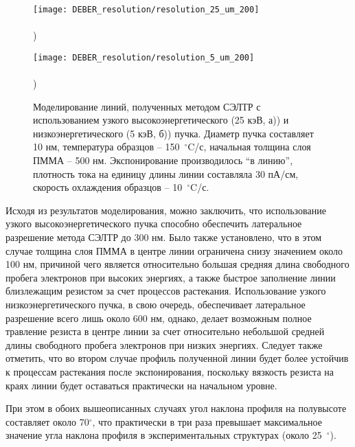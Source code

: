 \begin{figure}[t]
	\begin{minipage}{0.48\textwidth}
		\texttt{[image: DEBER\_resolution/resolution\_25\_um\_200]} \\
		\vspace{-28.7ex} \\ ) \\ \vspace{28.7ex}
	\end{minipage}
	\begin{minipage}{0.48\textwidth}
		\texttt{[image: DEBER\_resolution/resolution\_5\_um\_200]} \\
		\vspace{-28.7ex} \\ ) \\ \vspace{28.7ex}
	\end{minipage}
	\vspace{-3.5em}
	\caption{Моделирование линий, полученных методом СЭЛТР с использованием узкого высокоэнергетического (25 кэВ, а)) и низкоэнергетического (5 кэВ, б)) пучка. Диаметр пучка составляет 10 нм, температура образцов -- 150~$^\circ$C/с, начальная толщина слоя ПММА -- 500 нм. Экспонирование производилось ``в линию'', плотность тока на единицу длины линии составляла 30 пА/см, скорость охлаждения образцов -- 10~$^\circ$C/с.}
	\label{fig:DEBER_resolution}
\end{figure}

Исходя из результатов моделирования, можно заключить, что использование узкого высокоэнергетического пучка способно обеспечить латеральное разрешение метода СЭЛТР до 300 нм. Было также установлено, что в этом случае толщина слоя ПММА в центре линии ограничена снизу значением около 100 нм, причиной чего является относительно большая средняя длина свободного пробега электронов при высоких энергиях, а также быстрое заполнение линии близлежащим резистом за счет процессов растекания. Использование узкого низкоэнергетического пучка, в свою очередь, обеспечивает латеральное разрешение всего лишь около 600 нм, однако, делает возможным полное травление резиста в центре линии за счет относительно небольшой средней длины свободного пробега электронов при низких энергиях. Следует также отметить, что во втором случае профиль полученной линии будет более устойчив к процессам растекания после экспонирования, поскольку вязкость резиста на краях линии будет оставаться практически на начальном уровне.

При этом в обоих вышеописанных случаях угол наклона профиля на полувысоте составляет около 70$^\circ$, что практически в три раза превышает максимальное значение угла наклона профиля в экспериментальных структурах \linebreak (около 25~$^\circ$).
